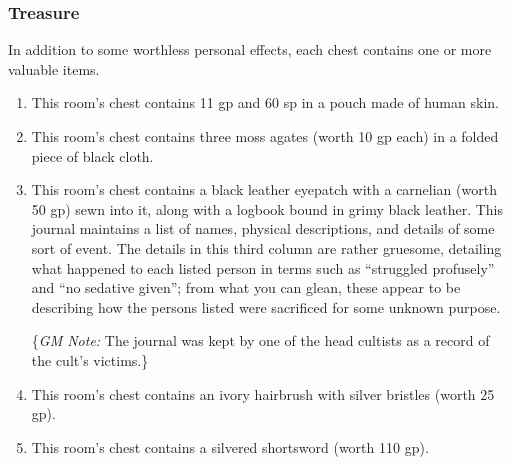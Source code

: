 \subsubsection*{Treasure}
In addition to some worthless personal effects, each chest contains one or more valuable items.
\begin{enumerate}[label={\textit{25\Alph*.}}]
  \item This room's chest contains 11 gp and 60 sp in a pouch made of human skin.
  \item This room's chest contains three moss agates (worth 10 gp each) in a folded piece of black cloth.
  \item This room's chest contains a black leather eyepatch with a carnelian (worth 50 gp) sewn into it, along
      with a logbook bound in grimy black leather. This journal maintains a list of names, physical
      descriptions, and details of some sort of event. The details in this third column are rather gruesome,
      detailing what happened to each listed person in terms such as ``struggled profusely'' and ``no sedative 
      given''; from what you can glean, these appear to be describing how the persons listed were sacrificed
      for some unknown purpose.
      
      \{\textit{GM Note:} The journal was kept by one of the head cultists as a record of the cult's victims.\}
  \item This room's chest contains an ivory hairbrush with silver bristles (worth 25 gp).
  \item This room's chest contains a silvered shortsword (worth 110 gp).
\end{enumerate}

\begin{arealinks}
\end{arealinks}


